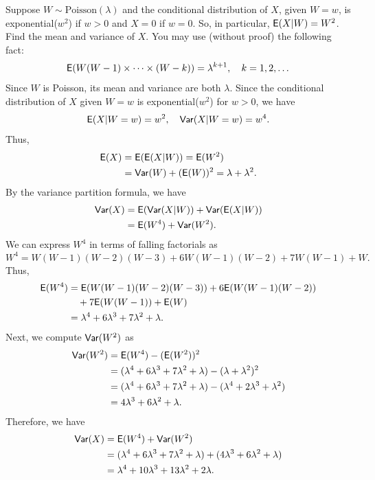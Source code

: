 \documentclass[12pt]{article}
\newcommand{\E}{{\sf E}}
\newcommand{\Var}{{\sf Var}}
\newenvironment{problem}[2][Problem]{\begin{trivlist}
\item[\hskip \labelsep {\bfseries #1}\hskip \labelsep {\bfseries #2.}]}
{\end{trivlist}}
\begin{document}
\begin{problem}{4} 
  Suppose $W \sim \text{Poisson}(\lambda)$ and the conditional distribution 
  of $X$, given $W = w$, is exponential($w^2$) if $w > 0$ and 
  $X = 0$ if $w = 0$. So, in particular, $\E(X|W ) = W^2$.\\
  Find the mean and variance of $X$. You may use (without proof) the 
  following fact:
  \[
    \E(W (W - 1) \times \cdots \times (W - k)) = \lambda^{k+1}, 
    \quad k = 1, 2, \dots
  \]
  Since $W$ is Poisson, its mean and variance are both $\lambda$.
  Since the conditional distribution of $X$ given $W = w$ is 
  exponential($w^2$) for $w > 0$, we have
  \[
    \E(X|W = w) = w^2, \quad \Var(X|W = w) = w^4.
  \]
  Thus,
  \begin{align*}
    \E(X) &= \E(\E(X|W)) = \E(W^2) \\
    &= \Var(W) + (\E(W))^2 = \lambda + \lambda^2.
  \end{align*}
  By the variance partition formula, we have
  \begin{align*}
    \Var(X) &= \E(\Var(X|W)) + \Var(\E(X|W)) \\
    &= \E(W^4) + \Var(W^2).
  \end{align*}
  We can express $W^4$ in terms of falling factorials as
  \[
    W^4 = W (W - 1) (W - 2) (W - 3) + 6 W (W - 1) (W - 2) 
    + 7 W (W - 1) + W.
  \]
  Thus,
  \begin{align*}
    \E(W^4) &= \E(W (W - 1) (W - 2) (W - 3)) + 6 \E(W (W - 1) (W - 2)) \\
    &\quad + 7 \E(W (W - 1)) + \E(W) \\
    &= \lambda^4 + 6 \lambda^3 + 7 \lambda^2 + \lambda.
  \end{align*}
  Next, we compute $\Var(W^2)$ as
  \begin{align*}
    \Var(W^2) &= \E(W^4) - (\E(W^2))^2 \\
    &= (\lambda^4 + 6 \lambda^3 + 7 \lambda^2 + \lambda) 
    - (\lambda + \lambda^2)^2 \\
    &= (\lambda^4 + 6 \lambda^3 + 7 \lambda^2 + \lambda) 
    - (\lambda^4 + 2 \lambda^3 + \lambda^2) \\
    &= 4 \lambda^3 + 6 \lambda^2 + \lambda.
  \end{align*}
  Therefore, we have
  \begin{align*}
    \Var(X) &= \E(W^4) + \Var(W^2) \\
    &= (\lambda^4 + 6 \lambda^3 + 7 \lambda^2 + \lambda) 
    + (4 \lambda^3 + 6 \lambda^2 + \lambda) \\
    &= \lambda^4 + 10 \lambda^3 + 13 \lambda^2 + 2 \lambda.
  \end{align*}
\end{problem}
\end{document}
